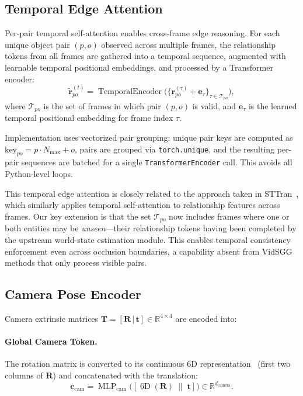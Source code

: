 \documentclass[runningheads]{llncs}
\newcommand{\mR}{\mathbb{R}}
\newcommand{\op}[1]{\operatorname{#1}}
\newcommand{\mat}[1]{\bm{#1}}
\begin{document}
\subsection{Temporal Edge Attention}
\label{sec:tea}

Per-pair temporal self-attention enables cross-frame edge reasoning.  For each unique object pair $(p, o)$ observed across multiple frames, the relationship tokens from all frames are gathered into a temporal sequence, augmented with learnable temporal positional embeddings, and processed by a Transformer encoder:
\begin{equation}
    \tilde{\mat{r}}_{po}^{(t)} = \op{TemporalEncoder}\bigl(\{{\mat{r}}_{po}^{(\tau)} + \mat{e}_{\tau}\}_{\tau \in \mathcal{T}_{po}}\bigr),
    \label{eq:tea}
\end{equation}
where $\mathcal{T}_{po}$ is the set of frames in which pair $(p,o)$ is valid, and $\mat{e}_{\tau}$ is the learned temporal positional embedding for frame index $\tau$.

Implementation uses vectorized pair grouping: unique pair keys are computed as $\text{key}_{po} = p \cdot N_{\max} + o$, pairs are grouped via \texttt{torch.unique}, and the resulting per-pair sequences are batched for a single \texttt{TransformerEncoder} call.  This avoids all Python-level loops.

This temporal edge attention is closely related to the approach taken in STTran~\cite{cong2021spatial}, which similarly applies temporal self-attention to relationship features across frames.  Our key extension is that the set $\mathcal{T}_{po}$ now includes frames where one or both entities may be \emph{unseen}---their relationship tokens having been completed by the upstream world-state estimation module.  This enables temporal consistency enforcement even across occlusion boundaries, a capability absent from VidSGG methods that only process visible pairs.


\subsection{Camera Pose Encoder}
\label{sec:cam_encoder}

Camera extrinsic matrices $\mat{T} = [\mat{R}\,|\,\mat{t}] \in \mR^{4 \times 4}$ are encoded into:

\paragraph{Global Camera Token.}  The rotation matrix is converted to its continuous 6D representation~\cite{zhou2019continuity} (first two columns of $\mat{R}$) and concatenated with the translation:
\begin{equation}
    \mat{c}_{\text{cam}} = \op{MLP}_{\text{cam}}\bigl([\op{6D}(\mat{R}) \;\|\; \mat{t}]\bigr) \in \mR^{d_{\text{camera}}}.
    \label{eq:cam_global}
\end{equation}
\end{document}
